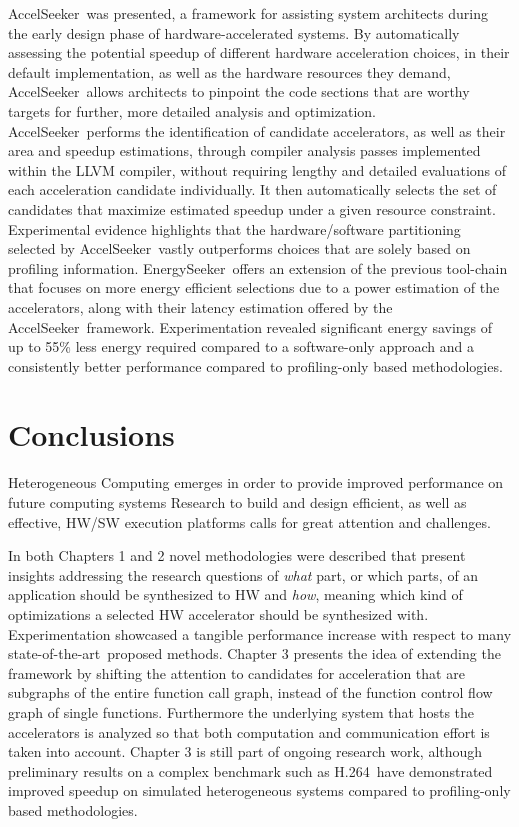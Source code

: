 \documentclass[]{usiinfthesis}
\newcommand{\aseeker}{{AccelSeeker}}
\newcommand{\eseeker}{{EnergySeeker}}
\newcommand{\htsf}{{H.264}}
\newcommand{\SoTA}{{state-of-the-art}}
\begin{document}
\aseeker\ was presented, a framework for assisting system architects during the early design phase of 
hardware-accelerated systems. By automatically assessing the potential speedup of different hardware 
acceleration choices, in their default implementation, as well as the hardware resources they demand, 
\aseeker\ allows architects to pinpoint the code sections that are worthy targets for further, more 
detailed analysis and optimization.
\aseeker\ performs the identification of candidate accelerators, as well as their area and speedup 
estimations, through compiler analysis passes implemented within the LLVM compiler, without requiring 
lengthy and detailed evaluations of each acceleration candidate individually. It then automatically 
selects the set of candidates that maximize estimated speedup under a given resource constraint. 
Experimental evidence highlights that the hardware/software partitioning selected by \aseeker\ vastly
outperforms choices that are solely based on profiling information.
\eseeker\ offers an extension of the previous tool-chain that focuses on more energy efficient selections
due to a power estimation of the accelerators, along with their latency estimation offered by the \aseeker\ 
framework. Experimentation revealed significant energy savings of up to 55\% less energy required compared to a software-only approach and a consistently better performance compared to profiling-only based methodologies.

\chapter*{Conclusions}

Heterogeneous Computing emerges in order to provide improved performance on future
computing systems 
Research to build and design efficient, as well as effective, HW/SW execution platforms calls for great 
attention and 
challenges.\par

In both Chapters 1 and 2 novel methodologies were described that present insights 
addressing the research questions of {\em what} part, or which parts, of an application 
should be synthesized to HW and {\em how}, meaning which kind of optimizations a selected 
HW accelerator should be synthesized with. Experimentation
showcased a tangible performance increase with respect to many \SoTA\ proposed methods.
Chapter 3 presents the idea of extending the  framework by shifting the attention 
to candidates for acceleration that are subgraphs of the entire function call graph, instead 
of the function control flow graph of single functions. Furthermore the underlying system 
that hosts the accelerators is analyzed so that both computation and communication effort 
is taken into account.
Chapter 3 is still part of ongoing research work, although preliminary results on a complex 
benchmark such as \htsf\ have  demonstrated improved speedup on simulated heterogeneous systems 
compared to profiling-only based methodologies.\par
\end{document}
